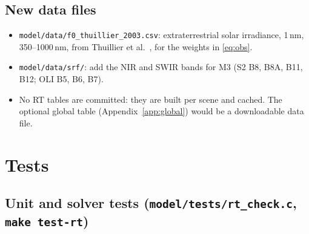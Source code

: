 \documentclass[11pt]{article}
\numberwithin{equation}{section}
\newcommand{\code}[1]{\texttt{#1}}
\begin{document}
\subsection{New data files}

\begin{itemize}
\item \code{model/data/f0\_thuillier\_2003.csv}: extraterrestrial solar irradiance, 1\,nm,
350--1000\,nm, from Thuillier et al.\ \cite{thuillier2003}, for the weights in \eqref{eq:obs}.
\item \code{model/data/srf/}: add the NIR and SWIR bands for M3 (S2 B8, B8A, B11, B12; OLI B5,
B6, B7).
\item No RT tables are committed: they are built per scene and cached. The optional global
table (Appendix~\ref{app:global}) would be a downloadable data file.
\end{itemize}

\section{Tests}\label{sec:tests}

\subsection{Unit and solver tests (\code{model/tests/rt\_check.c}, \code{make test-rt})}
\end{document}
